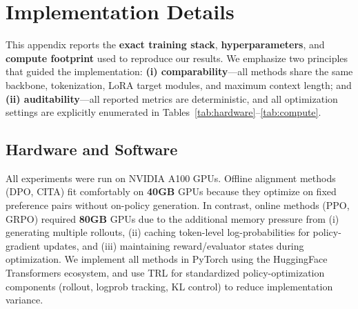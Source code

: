\section{Implementation Details}
\label{sec:appendix_implementation}

\vspace{-0.25em}
\noindent
This appendix reports the \textbf{exact training stack}, \textbf{hyperparameters}, and \textbf{compute footprint} used to reproduce our results.
We emphasize two principles that guided the implementation:
\textbf{(i) comparability}---all methods share the same backbone, tokenization, LoRA target modules, and maximum context length; and
\textbf{(ii) auditability}---all reported metrics are deterministic, and all optimization settings are explicitly enumerated in Tables~\ref{tab:hardware}--\ref{tab:compute}.

\subsection{Hardware and Software}

\vspace{-0.25em}
\noindent
All experiments were run on NVIDIA A100 GPUs. Offline alignment methods (\textsc{DPO}, \textsc{CITA}) fit comfortably on \textbf{40GB} GPUs because they optimize on fixed preference pairs without on-policy generation.
In contrast, online methods (\textsc{PPO}, \textsc{GRPO}) required \textbf{80GB} GPUs due to the additional memory pressure from (i) generating multiple rollouts, (ii) caching token-level log-probabilities for policy-gradient updates, and (iii) maintaining reward/evaluator states during optimization.
We implement all methods in PyTorch using the HuggingFace Transformers ecosystem, and use TRL for standardized policy-optimization components (rollout, logprob tracking, KL control) to reduce implementation variance.

\begin{table}[ht!]
\centering
\normalsize
\renewcommand{\arraystretch}{1.2}
\caption{\textbf{Hardware and software configuration.} We use TRL for consistent implementations of policy optimization and preference learning. Optuna with TPE is used for systematic hyperparameter search.}
\label{tab:hardware}
\end{table}

